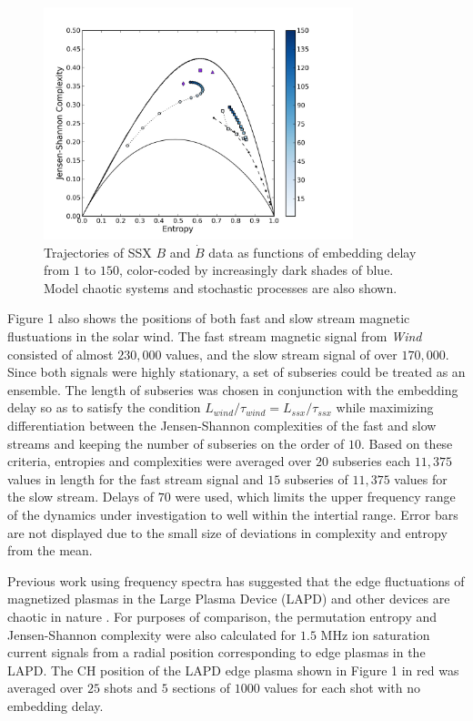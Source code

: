 \documentclass[aps,twocolumn,secnumarabic,nobalancelastpage,amsmath,amssymb,
nofootinbib]{revtex4-1}
\begin{document}
\begin{figure}[!htbp]
\centerline{
\includegraphics[width=9cm]{fig3.png}}
\caption{\label{Figure 3}Trajectories of SSX $B$ and $\dot{B}$ data as functions of embedding delay from $1$ to $150$, color-coded by increasingly dark shades of blue. Model chaotic systems and stochastic processes are also shown.}
\end{figure} 

Figure 1 also shows the positions of both fast and slow stream magnetic flustuations in the solar wind.  The fast stream magnetic signal from \textit{Wind} consisted of almost $230,000$ values, and the slow stream signal of over $170,000$. Since both signals were highly stationary, a set of subseries could be treated as an ensemble. The length of subseries was chosen in conjunction with the embedding delay so as to satisfy the condition $L_{wind}/\tau_{wind} = L_{ssx}/\tau_{ssx}$ while maximizing differentiation between the Jensen-Shannon complexities of the fast and slow streams and keeping the number of subseries on the order of $10$. Based on these criteria, entropies and complexities were averaged over $20$ subseries each $11,375$ values in length for the fast stream signal and $15$ subseries of $11,375$ values for the slow stream. Delays of $70$ were used, which limits the  upper frequency range of the dynamics under investigation to well within the intertial range. Error bars are not displayed due to the small size of deviations in complexity and entropy from the mean.

Previous work using frequency spectra has suggested that the edge fluctuations of magnetized plasmas in the Large Plasma Device (LAPD) and other devices are chaotic in nature \cite{maggs2012}. For purposes of comparison, the permutation entropy and Jensen-Shannon complexity were also calculated for $1.5$ MHz ion saturation current signals from a radial position corresponding to edge plasmas in the LAPD.  The CH position of the LAPD edge plasma shown in Figure 1 in red was averaged over $25$ shots and $5$ sections of $1000$ values for each shot with no embedding delay. 
\end{document}
